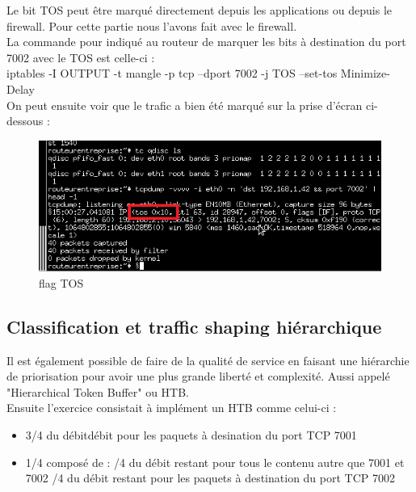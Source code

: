 \documentclass{article}
\begin{document}
Le bit TOS peut être marqué directement depuis les applications ou depuis le firewall. Pour cette partie nous l'avons fait avec le firewall.\\

La commande pour indiqué au routeur de marquer les bits à destination du port 7002 avec le TOS est celle-ci :\\

iptables -I OUTPUT -t mangle -p tcp --dport 7002 -j TOS --set-tos Minimize-Delay\\

On peut ensuite voir que le trafic a bien été marqué sur la prise d'écran ci-dessous : 

\begin{figure}[h]
  \centering
  \includegraphics[width=\linewidth]{./captures/tos-Flag.png}
  \caption{flag TOS}
  \label{fig:token-bucket}
\end{figure}


\subsection{Classification et traffic shaping hiérarchique}

Il est également possible de faire de la qualité de service en faisant une hiérarchie de priorisation pour avoir une plus grande liberté et complexité. Aussi appelé "Hierarchical Token Buffer" ou HTB. \\

Ensuite l'exercice consistait à implément un HTB comme celui-ci : \\

\begin{itemize}
	\item 3/4 du débitdébit pour les paquets à desination du port TCP 7001
	\item 1/4 composé de : 
	/4 du débit restant pour tous le contenu autre que 7001 et 7002
	/4 du débit restant pour les paquets à destination du port TCP 7002
\end{itemize}
\end{document}
